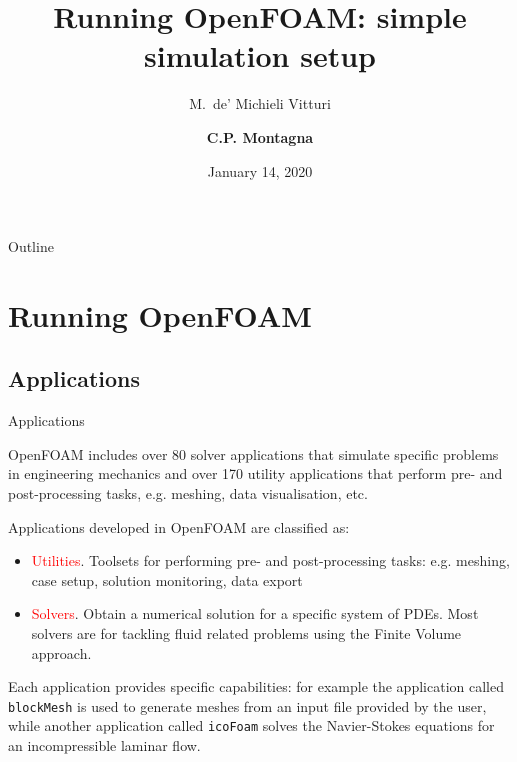 \documentclass{beamer}
\title[Runnig OpenFOAM]
{Running OpenFOAM: simple simulation setup}
\author[] 
{M.~de' Michieli Vitturi \and \textbf{C.P. Montagna}}
\institute[]
{
  Istituto Nazionale di Geofisica e Vulcanologia, Italy \\
}
\date{January 14, 2020}
\begin{document}
\begin{frame}
  \titlepage
\end{frame}


\begin{frame}{Outline}
  \tableofcontents
\end{frame}

\section{Running OpenFOAM}

\subsection{Applications}


\begin{frame}{Applications}

OpenFOAM includes over 80 solver applications that simulate specific problems in engineering mechanics and over 170 utility applications that perform pre- and post-processing tasks, e.g. meshing, data visualisation, etc.


Applications developed in OpenFOAM are classified as:

\begin{itemize}
\item \textcolor{red}{Utilities}. Toolsets for performing pre- and post-processing tasks: e.g. meshing, case setup, solution monitoring, data export
\item \textcolor{red}{Solvers}. Obtain a numerical solution for a specific system of PDEs. Most solvers are for tackling fluid related problems using the Finite Volume approach.
\end{itemize}

\begin{block}

{\small Each application provides specific capabilities: for example the application called \texttt{blockMesh} is used to generate meshes from an input file provided by the user, while another application called \texttt{icoFoam} solves the Navier-Stokes equations for an incompressible laminar flow.}
\end{block}

\end{frame}
\end{document}
